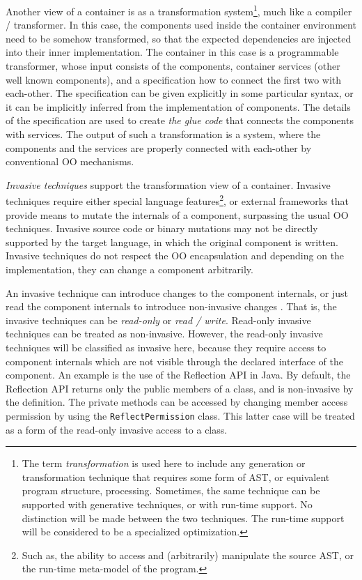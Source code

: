 Another view of a container is as a transformation system\footnote{The term \textit{transformation} is used here to include any generation or transformation technique that requires some form of AST, or equivalent program structure, processing. Sometimes, the same technique can be supported with generative techniques, or with run-time support. No distinction will be made between the two techniques. The run-time support will be considered to be a specialized optimization.}, much like a compiler / transformer. In this case, the components used inside the container environment need to be somehow transformed, so that the expected dependencies are injected into their inner implementation. The container in this case is a programmable transformer, whose input consists of the components, container services (other well known components), and a specification how to connect the first two with each-other. The specification can be given explicitly in some particular syntax, or it can be implicitly inferred from the implementation of components. The details of the specification are used to create \textit{the glue code} \cite{halloway.02} that connects the components with services. The output of such a transformation is a system, where the components and the services are properly connected with each-other by conventional OO mechanisms.

\textit{Invasive techniques} support the transformation view of a container. Invasive techniques require either special language features\footnote{Such as, the ability to access and (arbitrarily) manipulate the source AST, or the run-time meta-model of the program.}, or external frameworks that provide means to mutate the internals of a component, surpassing the usual OO techniques. Invasive source code or binary mutations may not be directly supported by the target language, in which the original component is written. Invasive techniques do not respect the OO encapsulation and depending on the implementation, they can change a component arbitrarily.

An invasive technique can introduce changes to the component internals, or just read the component internals to introduce non-invasive changes . That is, the invasive techniques can be \textit{read-only} or \textit{read / write}. Read-only invasive techniques can be treated as non-invasive. However, the read-only invasive techniques will be classified as invasive here, because they require access to component internals which are not visible through the declared interface of the component. An example is the use of the Reflection API in Java. By default, the Reflection API  returns only the public members of a class, and is non-invasive by the definition. The private methods can be accessed by changing member access permission by using the \texttt{Reflect\-Permi\-ssion} class. This latter case will be treated as a form of the read-only invasive access to a class.

